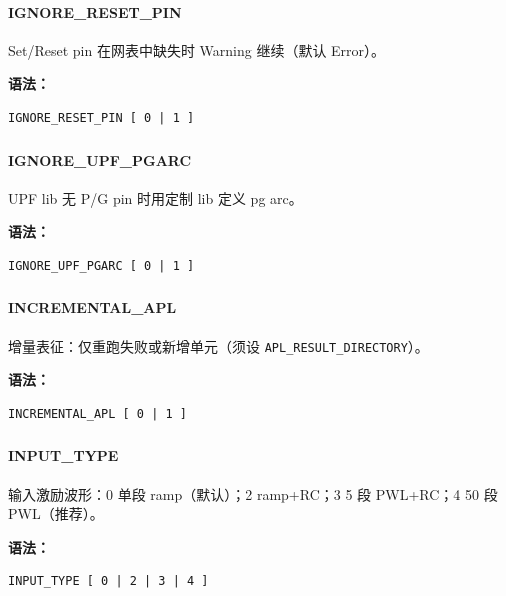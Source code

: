 \paragraph*{IGNORE_RESET_PIN}

Set/Reset pin 在网表中缺失时 Warning 继续（默认 Error）。

\textbf{语法：}
\begin{lstlisting}
IGNORE_RESET_PIN [ 0 | 1 ]
\end{lstlisting}

\subsubsection{}
\paragraph*{IGNORE_UPF_PGARC}

UPF lib 无 P/G pin 时用定制 lib 定义 pg arc。

\textbf{语法：}
\begin{lstlisting}
IGNORE_UPF_PGARC [ 0 | 1 ]
\end{lstlisting}

\subsubsection{}
\paragraph*{INCREMENTAL_APL}

增量表征：仅重跑失败或新增单元（须设 \texttt{APL\_RESULT\_DIRECTORY}）。

\textbf{语法：}
\begin{lstlisting}
INCREMENTAL_APL [ 0 | 1 ]
\end{lstlisting}

\subsubsection{}
\paragraph*{INPUT_TYPE}

输入激励波形：0 单段 ramp（默认）；2 ramp+RC；3 5 段 PWL+RC；4 50 段 PWL（推荐）。

\textbf{语法：}
\begin{lstlisting}
INPUT_TYPE [ 0 | 2 | 3 | 4 ]
\end{lstlisting}

